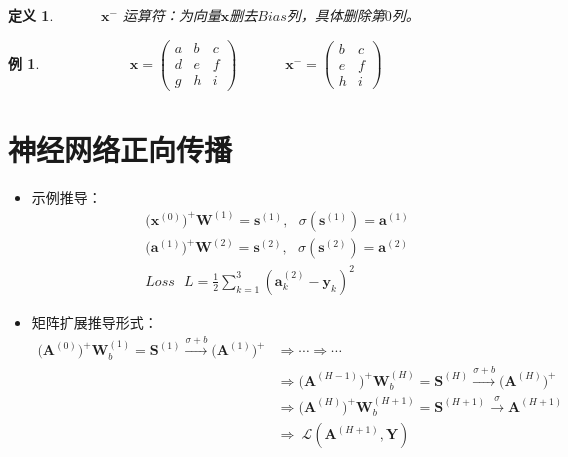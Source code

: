 \documentclass[UTF-8]{progbookcn}
\newtheorem{example}{例}[chapter]         %
\newtheorem{definition}{定义}[chapter]
\begin{document}
\begin{definition}
  ~~~~~~$\bm{x}^-$ 运算符：为向量$\bm{x}$删去$Bias$列，具体删除第$0$列。
\end{definition}

\begin{example}
~~~~~~~~~~~~$\bm{x} = \left(
 \begin{matrix}
   a & b & c \\
   d & e & f \\
   g & h & i
  \end{matrix}
  \right) $~~~~~~
  $\bm{x}^- = \left(
\begin{matrix}
    b & c \\
    e & f \\
    h & i
  \end{matrix}
  \right) $
\end{example}






\section{神经网络正向传播}
\begin{itemize}
  \item 示例推导：
      \begin{align*}
       & \big(\bm{x}^{(0)}\big)^+\bm{W}^{(1)}=\bm{s}^{(1)},~~~\sigma(\bm{s}^{(1)})=\bm{a}^{(1)}\\
        & \big(\bm{a}^{(1)}\big)^+\bm{W}^{(2)}=\bm{s}^{(2)},~~~\sigma(\bm{s}^{(2)})=\bm{a}^{(2)} \\
        & Loss~~~L=\frac{1}{2}\sum_{k=1}^{3}(\bm{a}^{(2)}_k-\bm{y}_k)^2
      \end{align*}

  \item 矩阵扩展推导形式：
    \begin{align*}
       \big(\bm{A}^{(0)}\big)^+\bm{W}_b^{(1)}=\bm{S}^{(1)}\stackrel{\sigma+b}{\longrightarrow} \big(\bm{A}^{(1)}\big)^+&\Rightarrow \cdots \Rightarrow \cdots \\
      & \Rightarrow \big(\bm{A}^{(H-1)}\big)^+\bm{W}_b^{(H)}=\bm{S}^{(H)} \stackrel{\sigma+b}{\longrightarrow}\big(\bm{A}^{(H)}\big)^+  \\
      & \Rightarrow \big(\bm{A}^{(H)}\big)^+\bm{W}_b^{(H+1)}=\bm{S}^{(H+1)}\stackrel{\sigma}{\longrightarrow} \bm{A}^{(H+1)} \\
      & \Rightarrow ~\mathcal{L}(\bm{A}^{(H+1)},\bm{Y})
    \end{align*}
\end{itemize}
\end{document}
